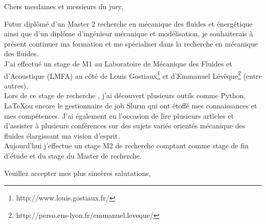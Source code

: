 \documentclass[11pt,a4paper]{letter} %
\begin{document}

\begin{letter}


\opening{Chers mesdames et messieurs du jury,}

Futur diplômé d'un Master 2 recherche en mécanique des fluides et énergétique ainsi que d'un diplôme d'ingénieur mécanique et modélisation, je souhaiterais à présent continuer ma formation et me spécialiser dans la recherche en mécanique des fluides. \\ 
J'ai effectué un stage de M1 au Laboratoire de Mécanique des Fluides et d'Acoustique (LMFA) au côté de Louis Gostiaux\footnote{http://www.louis.gostiaux.fr/} et d'Emmanuel Lévêque\footnote{http://perso.ens-lyon.fr/emmanuel.leveque/} (entre autres). \\
Lors de ce stage de recherche , j'ai découvert plusieurs outils comme Python, \LaTeX ou encore le gestionnaire de job Slurm qui ont étoffé mes connaissances et mes compétences. J'ai également eu l'occasion de lire plusieurs articles et d'assister à plusieurs conférences sur des sujets variés orientés mécanique des fluides élargissant ma vision d'esprit. \\
Aujourd'hui j'effectue un stage M2 de recherche comptant comme stage de fin d'étude et du stage du Master de recherche.

\closing{Veuillez accepter mes plus sincères salutations,}


\end{letter}
\end{document}
